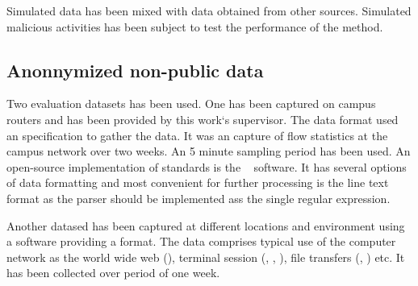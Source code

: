 Simulated data has been mixed with data obtained from other sources. Simulated 
malicious activities has been subject to test the performance of the method.


%
%
%
%

\subsection{Anonnymized non-public data}\label{susec:non-pub}

Two evaluation datasets has been used. One has been captured on campus routers
and has been provided by this work`s supervisor. The data format used an  specification
to gather the data. It was an capture of flow statistics at the campus network over
two weeks. An 5 minute sampling period has been used. An open-source implementation
of  standards is the ~\cite{haag2006netflow} software.
It has several options of data formatting and most convenient for further processing
is the line text format as the parser should be implemented ass the single regular expression.

Another datased has been captured at different locations and environment using a  
software providing a  format. The data comprises typical use of the computer network
as the world wide web (), terminal session (, , ), 
file transfers (, ) etc. It has been collected over period of one week.

